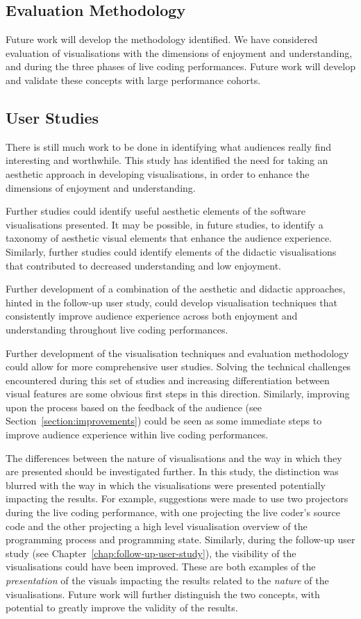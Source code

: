 \subsection{Evaluation Methodology}

Future work will develop the methodology identified. We have considered evaluation of visualisations with the dimensions of  enjoyment and understanding, and during the three phases of live coding performances. Future work will develop and validate these concepts with large performance cohorts.

\subsection{User Studies}

There is still much work to be done in identifying what audiences really find interesting and worthwhile. This study has identified the need for taking an aesthetic approach in developing visualisations, in order to enhance the dimensions of enjoyment and understanding.

Further studies could identify useful aesthetic elements of the software visualisations presented. It may be possible, in future studies, to identify a taxonomy of aesthetic visual elements that enhance the audience experience. Similarly, further studies could identify elements of the didactic visualisations that contributed to decreased understanding and low enjoyment.

Further development of a combination of the aesthetic and didactic approaches, hinted in the follow-up user study, could develop visualisation techniques that consistently improve audience experience across both enjoyment and understanding throughout live coding performances.

Further development of the visualisation techniques and evaluation methodology could allow for more comprehensive user studies. Solving the technical challenges encountered during this set of studies and increasing differentiation between visual features are some obvious first steps in this direction. Similarly, improving upon the process based on the feedback of the audience (see Section~\ref{section:improvements}) could be seen as some immediate steps to improve audience experience within live coding performances. 

The differences between the nature of visualisations and the way in which they are presented should be investigated further. In this study, the distinction was blurred with the way in which the visualisations were presented potentially impacting the results. For example, suggestions were made to use two projectors during the live coding performance, with one projecting the live coder's source code and the other projecting a high level visualisation overview of the programming process and programming state. Similarly, during the follow-up user study (see Chapter~\ref{chap:follow-up-user-study}), the visibility of the visualisations could have been improved. These are both examples of the \textit{presentation} of the visuals impacting the results related to the \textit{nature} of the visualisations. Future work will further distinguish the two concepts, with potential to greatly improve the validity of the results.

